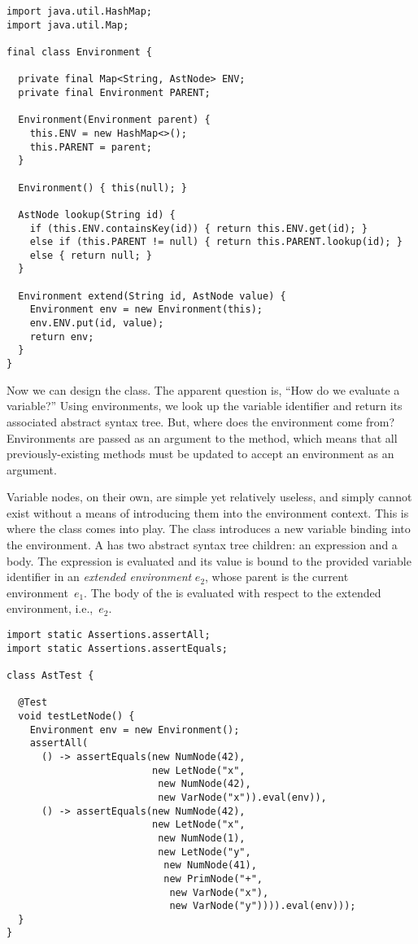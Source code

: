 \enlargethispage{3\baselineskip}
\begin{lstlisting}[language=MyJava]
import java.util.HashMap;
import java.util.Map;

final class Environment {

  private final Map<String, AstNode> ENV;
  private final Environment PARENT;

  Environment(Environment parent) { 
    this.ENV = new HashMap<>(); 
    this.PARENT = parent; 
  }

  Environment() { this(null); }

  AstNode lookup(String id) {
    if (this.ENV.containsKey(id)) { return this.ENV.get(id); }
    else if (this.PARENT != null) { return this.PARENT.lookup(id); }
    else { return null; }
  }

  Environment extend(String id, AstNode value) {
    Environment env = new Environment(this);
    env.ENV.put(id, value);
    return env;
  }
}
\end{lstlisting}

Now we can design the  class. 
The apparent question is, ``How do we evaluate a variable?'' 
Using environments, we look up the variable identifier and return its associated abstract syntax tree. 
But, where does the environment come from? 
Environments are passed as an argument to the  method, which means that all previously-existing  methods must be updated to accept an environment as an argument.

Variable nodes, on their own, are simple yet relatively useless, and simply cannot exist without a means of introducing them into the environment context. 
This is where the  class comes into play. 
The  class introduces a new variable binding into the environment. 
A  has two abstract syntax tree children: an expression and a body. The expression is evaluated and its value is bound to the provided variable identifier in an \emph{extended environment} $e_2$, whose parent is the current environment~$e_1$. The body of the  is evaluated with respect to the extended environment, i.e.,~$e_2$.

\begin{lstlisting}[language=MyJava]
import static Assertions.assertAll;
import static Assertions.assertEquals;

class AstTest {

  @Test
  void testLetNode() {
    Environment env = new Environment();
    assertAll(
      () -> assertEquals(new NumNode(42),
                         new LetNode("x", 
                          new NumNode(42),
                          new VarNode("x")).eval(env)),
      () -> assertEquals(new NumNode(42),
                         new LetNode("x", 
                          new NumNode(1),
                          new LetNode("y", 
                           new NumNode(41),
                           new PrimNode("+", 
                            new VarNode("x"), 
                            new VarNode("y")))).eval(env)));
  }
}
\end{lstlisting}

